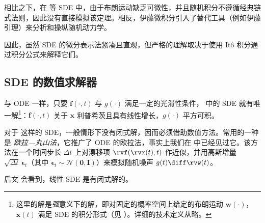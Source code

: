 相比之下，在  等 SDE 中，由于布朗运动缺乏可微性，并且随机积分不遵循经典链式法则，因此没有直接模拟该定理。相反，伊藤微积分引入了替代工具（例如伊藤引理）来分析和操纵随机动力学。

因此，虽然 SDE 的微分表示法紧凑且直观，但严格的理解取决于使用 Itô 积分通过积分公式来解释它们。

\subsection{SDE 的数值求解器}

与 ODE 一样，只要 $\mathbf{f}(\cdot, t)$ 与 $g(\cdot)$ 满足一定的光滑性条件， 中的 SDE 就有唯一解\footnote{这里的解是\emph{强}意义下的解，即对固定的概率空间上给定的布朗运动 $\mathbf{w}(\cdot)$，$\mathbf{x}(t)$ 满足 SDE 的积分形式（见 ）。详细的技术定义从略。}：$\mathbf{f}(\cdot, t)$ 关于 $\mathbf{x}$ 利普希茨且具有线性增长，$g(\cdot)$ 平方可积。

对于  这样的 SDE，一般情形下没有闭式解，因而必须借助数值方法。常用的一种是 \emph{欧拉—丸山法}，它推广了 ODE 的欧拉法，事实上我们在  中已经见过它。该方法在一个时间步长 $\Delta t$ 上对漂移项 $\rvf(\rvx(t), t)$ 作近似，并用高斯增量 $\sqrt{\Delta t}\,\boldsymbol{\epsilon}_t$（其中 $\boldsymbol{\epsilon}_t \sim \mathcal{N}(\mathbf{0}, \mathbf{I})$）来模拟随机噪声 $g(t) \diff \rvw(t)$。

后文  会看到，线性 SDE 是有闭式解的。


